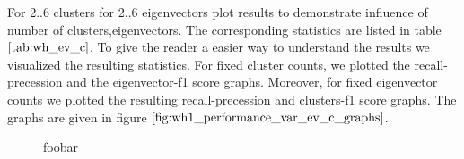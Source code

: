 For 2..6 clusters for 2..6 eigenvectors plot results to demonstrate influence
of number of clusters,eigenvectors. The corresponding statistics are listed in table $\ref{tab:wh_ev_c}$. To give the reader a easier way to understand the results we visualized the resulting statistics. For fixed cluster counts, we plotted the recall-precession and the eigenvector-f1 score graphs. Moreover, for fixed eigenvector counts we plotted the resulting recall-precession and clusters-f1 score graphs. The graphs are given in figure $\ref{fig:wh1_performance_var_ev_c_graphs}$.
\begin{figure}[H]
\begin{center}
\end{center}
\caption[Plot Performance Varying CLuster/Eigenvectors]{foobar}
\label{fig:wh1_performance_var_ev_c_graphs}
\end{figure}
